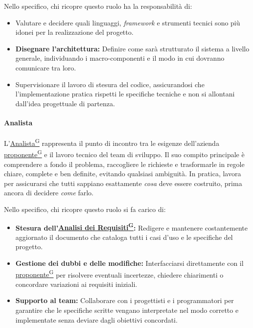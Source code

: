 \documentclass[a4paper,12pt]{article}
\providecommand{\glslink}[2]{\href{https://alittlebyte-19.github.io/Documentazione/glossario.html\#gls-#1}{\underline{#2}\textsuperscript{\scriptsize G}}}
\begin{document}
Nello specifico, chi ricopre questo ruolo ha la responsabilità di:

\begin{itemize}
    \item Valutare e decidere quali linguaggi, \textit{framework} e strumenti tecnici sono più idonei per la realizzazione del progetto.
    
    \item \textbf{Disegnare l'architettura:} Definire come sarà strutturato il sistema a livello generale, individuando i macro-componenti e il modo in cui dovranno comunicare tra loro.
    
    \item Supervisionare il lavoro di stesura del codice, assicurandosi che l'implementazione pratica rispetti le specifiche tecniche e non si allontani dall'idea progettuale di partenza.
\end{itemize}

\paragraph{Analista}

L'\glslink{analista}{Analista} rappresenta il punto di incontro tra le esigenze dell'azienda \glslink{committente-proponente}{proponente} e il lavoro tecnico del team di sviluppo. Il suo compito principale è comprendere a fondo il problema, raccogliere le richieste e trasformarle in regole chiare, complete e ben definite, evitando qualsiasi ambiguità. In pratica, lavora per assicurarsi che tutti sappiano esattamente \textit{cosa} deve essere costruito, prima ancora di decidere \textit{come} farlo.

Nello specifico, chi ricopre questo ruolo si fa carico di:

\begin{itemize}
    \item \textbf{Stesura dell'\glslink{analisi-dei-requisiti-adr}{Analisi dei Requisiti}:} Redigere e mantenere costantemente aggiornato il documento che cataloga tutti i casi d'uso e le specifiche del progetto.
    
    \item \textbf{Gestione dei dubbi e delle modifiche:} Interfacciarsi direttamente con il \glslink{committente-proponente}{proponente} per risolvere eventuali incertezze, chiedere chiarimenti o concordare variazioni ai requisiti iniziali.
    
    \item \textbf{Supporto al team:} Collaborare con i progettisti e i programmatori per garantire che le specifiche scritte vengano interpretate nel modo corretto e implementate senza deviare dagli obiettivi concordati.
\end{itemize}
\end{document}
